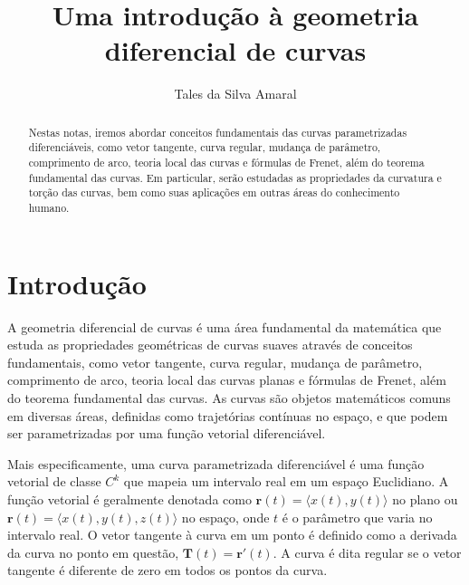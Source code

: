 \documentclass[12pt,leqno,twoside]{amsart}
\theoremstyle{definition}
\begin{document}
\title{Uma  introdução à geometria diferencial de curvas}

 \author{\sc Tales da Silva Amaral}
	\address{\sc Tales: UFES, 	Universidade Federal do Esp\'irito Santo,  Av. Fernando Ferrari, 514 - CEP 29.075-910 Vit\'oria, Espirito Santo,  Brazil}


 \begin{abstract}
Nestas notas, iremos abordar conceitos fundamentais das curvas parametrizadas diferenciáveis, como vetor tangente, curva regular, mudança de parâmetro, comprimento de arco, teoria local das curvas  e fórmulas de Frenet, além do teorema fundamental das curvas. Em particular, serão estudadas as propriedades da curvatura e torção das curvas, bem como suas aplicações em outras áreas do conhecimento humano. %
 \end{abstract}
	\maketitle

\section{Introdução}
A geometria diferencial de curvas  é uma área fundamental da matemática que estuda as propriedades geométricas de curvas suaves através de conceitos fundamentais, como vetor tangente, curva regular, mudança de parâmetro, comprimento de arco, teoria local das curvas planas e fórmulas de Frenet, além do teorema fundamental das curvas.
As curvas são objetos matemáticos comuns em diversas áreas, definidas como trajetórias contínuas no espaço, e que podem ser parametrizadas por uma função vetorial diferenciável.

\vspace{0.3cm}

Mais especificamente, uma curva parametrizada diferenciável é uma função vetorial de classe $C^k$ que mapeia um intervalo real em um espaço Euclidiano. A função vetorial é geralmente denotada como $\mathbf{r}(t) = \langle x(t), y(t) \rangle$ no plano ou $\mathbf{r}(t) = \langle x(t), y(t), z(t)\rangle$ no espaço,  onde $t$ é o parâmetro que varia no intervalo real. O vetor tangente à curva em um ponto é definido como a derivada da curva no ponto em questão, $\mathbf{T}(t) = \mathbf{r}'(t)$. A curva é dita regular se o vetor tangente é diferente de zero em todos os pontos da curva.
\end{document}
